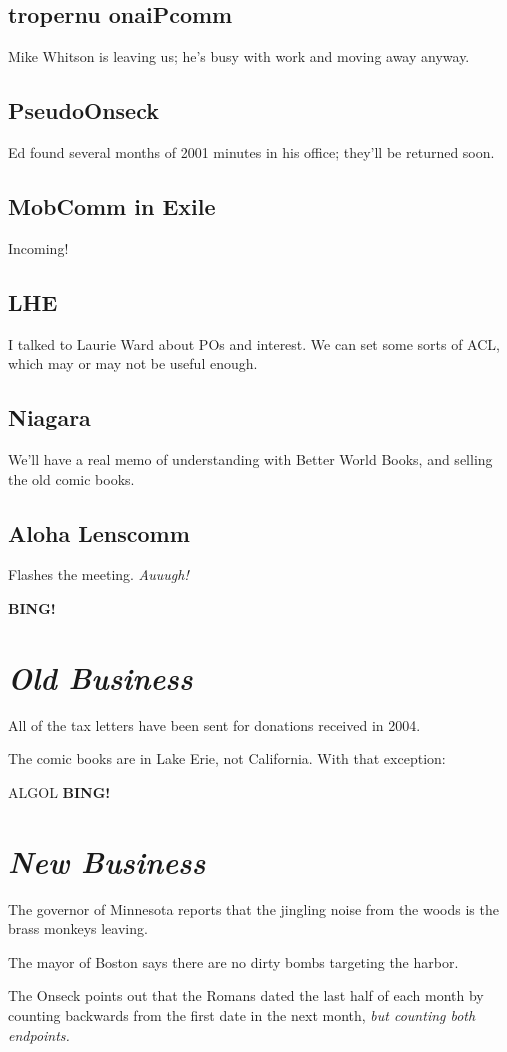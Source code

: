 \documentclass[10pt]{article}
\newcommand{\bing}{{\bf BING!} }
\newcommand{\goto}[1]{\bing \vskip 12pt \section*{{\em{#1}}}}
\begin{document}
\subsection*{tropernu onaiPcomm}
Mike Whitson is leaving us; he's busy with work and moving away anyway.

\subsection*{PseudoOnseck}
Ed found several months of 2001 minutes in his office; they'll be
returned soon.

\subsection*{MobComm in Exile}
Incoming!

\subsection*{LHE}
I talked to Laurie Ward about POs and interest.  We can set some sorts
of ACL, which may or may not be useful enough.

\subsection*{Niagara}
We'll have a real memo of understanding with Better World Books, and
selling the old comic books.

\subsection*{Aloha Lenscomm}
Flashes the meeting. \emph{Auuugh!}

\goto{Old Business}

All of the tax letters have been sent for donations received in 2004.

The comic books are in Lake Erie, not California.  With that exception:

ALGOL
\goto{New Business}

The governor of Minnesota reports that the jingling noise from the
woods is the brass monkeys leaving.

The mayor of Boston says there are no dirty bombs targeting the
harbor.

The Onseck points out that the Romans dated the last half of each
month by counting backwards from the first date in the next month,
\emph{but counting both endpoints.}
\end{document}
